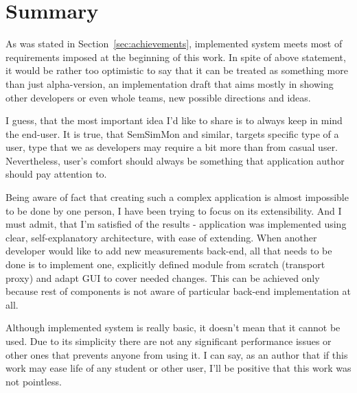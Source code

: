 %
\section{Summary}
\label{sec:summary}

As was stated in Section~\ref{sec:achievements}, implemented system meets most of requirements imposed at the beginning of this work. In spite of above statement, it would be rather too optimistic to say that it can be treated as something more than just alpha-version, an implementation draft that aims mostly in showing other developers or even whole teams, new possible directions and ideas.

I guess, that the most important idea I\rq{}d like to share is to always keep in mind the end-user. It is true, that SemSimMon and similar, targets specific type of a user, type that we as developers may require a bit more than from casual user. Nevertheless, user\rq{}s comfort should always be something that application author should pay attention to.

Being aware of fact that creating such a complex application is almost impossible to be done by one person, I have been trying to focus on its extensibility. And I must admit, that I\rq{}m satisfied of the results - application was implemented using clear, self-explanatory architecture, with ease of extending. When another developer would like to add new measurements back-end, all that needs to be done is to implement one, explicitly defined module from scratch (transport proxy) and adapt GUI to cover needed changes. This can be achieved only because rest of components is not aware of particular back-end implementation at all.

Although implemented system is really basic, it doesn\rq{}t mean that it cannot be used. Due to its simplicity there are not any significant performance issues or other ones that prevents anyone from using it. I can say, as an author that if this work may ease life of any student or other user, I\rq{}ll be positive that this work was not pointless. 


